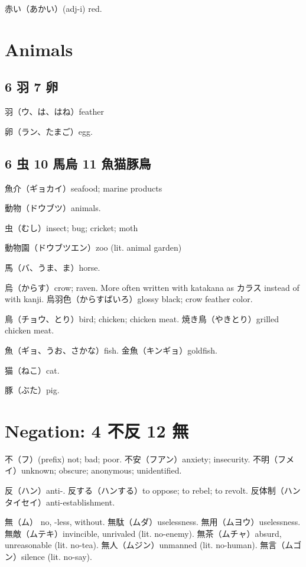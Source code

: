 赤い（あかい）(adj-i) red.

\section{Animals}

\subsection{6 羽 7 卵}

羽（ウ、は、はね）feather

卵（ラン、たまご）egg.

\subsection{6 虫 10 馬烏 11 魚猫豚鳥}

魚介（ギョカイ）seafood; marine products

動物（ドウブツ）animals.

虫（むし）insect; bug; cricket; moth

動物園（ドウブツエン）zoo (lit. animal garden)

馬（バ、うま、ま）horse.

烏（からす）crow; raven.
More often written with katakana as カラス instead of with kanji.
烏羽色（からすばいろ）glossy black; crow feather color.

鳥（チョウ、とり）bird; chicken; chicken meat.
焼き鳥（やきとり）grilled chicken meat.

魚（ギョ、うお、さかな）fish.
金魚（キンギョ）goldfish.

猫（ねこ）cat.

豚（ぶた）pig.

\section{Negation: 4 不反 12 無}

不（フ）(prefix) not; bad; poor.
不安（フアン）anxiety; insecurity.
不明（フメイ）unknown; obscure; anonymous; unidentified.

反（ハン）anti-.
反する（ハンする）to oppose; to rebel; to revolt.
反体制（ハンタイセイ）anti-establishment.

無（ム） no, -less, without.
無駄（ムダ）uselessness.
無用（ムヨウ）uselessness.
無敵（ムテキ）invincible, unrivaled (lit. no-enemy).
無茶（ムチャ）absurd, unreasonable (lit. no-tea).
無人（ムジン）unmanned (lit. no-human).
無言（ムゴン）silence (lit. no-say).

